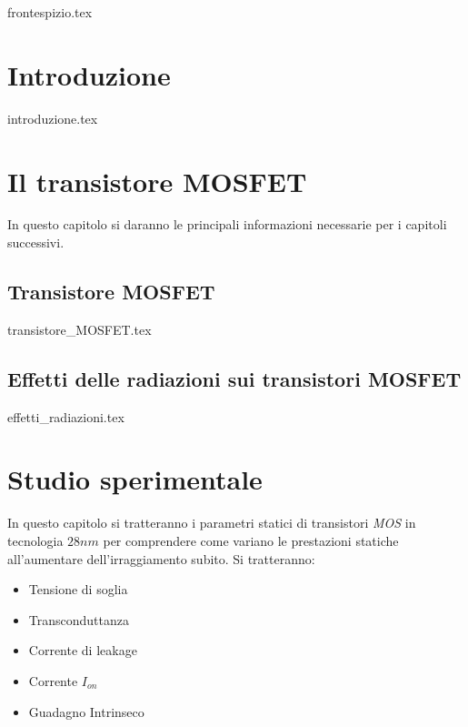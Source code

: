 \documentclass[
	a4paper,
	cleardoublepage=empty,
	headings=twolinechapter,
	numbers=autoenddot,
]{scrbook}
\begin{document}
\frontmatter

{frontespizio.tex}

\tableofcontents
\listoffigures

\mainmatter

\chapter*{Introduzione}
{introduzione.tex}



\chapter{Il transistore MOSFET}
In questo capitolo si daranno le principali informazioni necessarie per i capitoli successivi.
\section{Transistore MOSFET}
{transistore_MOSFET.tex}

\section{Effetti delle radiazioni sui transistori MOSFET}
{effetti_radiazioni.tex}


\chapter{Studio sperimentale}
In questo capitolo si tratteranno i parametri statici di transistori \emph{MOS} in tecnologia $28 nm$ per comprendere come variano le prestazioni statiche all'aumentare dell'irraggiamento subito. Si tratteranno:
\begin{itemize}
  \item Tensione di soglia
  \item Transconduttanza
  \item Corrente di leakage
  \item Corrente $I_{on}$
  \item Guadagno Intrinseco
\end{itemize}
\end{document}
